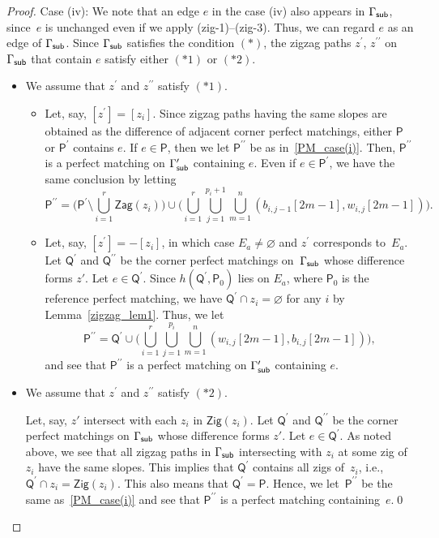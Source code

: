 \documentclass[pdftex]{sigma}%
\numberwithin{equation}{section}
\numberwithin{figure}{section}
\numberwithin{table}{section}
\newcommand{\sfP}{\mathsf{P}}
\newcommand{\sfQ}{\mathsf{Q}}
\newcommand{\Zig}{\mathsf{Zig}}
\newcommand{\Zag}{\mathsf{Zag}}
\begin{document}
\begin{proof}
Case (iv): We note that an edge $e$ in the case (iv) also appears in $\Gamma_{\sf sub}$, since~$e$ is unchanged even if we apply (zig-1)--(zig-3).
Thus, we can regard $e$ as an edge of $\Gamma_{\sf sub}$.
Since $\Gamma_{\sf sub}$ satisfies the condition $(*)$, the zigzag paths $z^\prime$, $z^{\prime\prime}$ on~$\Gamma_{\sf sub}$ that contain $e$ satisfy
either $(*1)$ or $(*2)$.
\begin{itemize}\itemsep=0pt
\item We assume that $z^\prime$ and $z^{\prime\prime}$ satisfy $(*1)$.
\begin{itemize}\itemsep=0pt
\item Let, say, $[z^\prime]=[z_i]$.
Since zigzag paths having the same slopes are obtained as the difference of adjacent corner perfect matchings, either $\sfP$ or $\sfP^\prime$ contains $e$.
If $e \in \sfP$, then we let $\sfP^{\prime\prime}$ be as in~\eqref{PM_case(i)}.
Then, $\sfP^{\prime\prime}$ is a perfect matching on $\Gamma^\prime_{\sf sub}$ containing $e$.
Even if $e \in \sfP^\prime$, we have the same conclusion by letting
\begin{displaymath}
\sfP^{\prime\prime}=\bigg(\sfP^\prime \setminus \bigcup_{i=1}^r \Zag(z_i)\bigg) \cup \bigg(\bigcup_{i=1}^r \bigcup_{j=1}^{p_i+1} \bigcup_{m=1}^n(b_{i,j-1}[2m-1],w_{i,j}[2m-1])\bigg).
\end{displaymath}
\item Let, say, $[z^\prime]=-[z_i]$, in which case $E_a\neq \varnothing$ and $z^\prime$ corresponds to~$E_a$.
Let $\sfQ^\prime$ and $\sfQ^{\prime\prime}$ be the corner perfect matchings on~$\Gamma_{\sf sub}$ whose difference forms $z'$. Let $e \in \sfQ^\prime$.
Since $h(\sfQ^\prime,\sfP_0)$ lies on $E_a$, where $\sfP_0$ is the reference perfect matching, we have $\sfQ^\prime\cap z_i=\varnothing$ for any $i$ by Lemma~\ref{zigzag_lem1}.
Thus, we let
\begin{displaymath}
\sfP^{\prime\prime}=\sfQ^\prime \cup \bigg(\bigcup_{i=1}^r \bigcup_{j=1}^{p_i} \bigcup_{m=1}^n(w_{i,j}[2m-1],b_{i,j}[2m-1])\bigg),
\end{displaymath}
and see that $\sfP^{\prime\prime}$ is a perfect matching on $\Gamma^\prime_{\sf sub}$ containing $e$.
\end{itemize}
\item We assume that $z^\prime$ and $z^{\prime\prime}$ satisfy $(*2)$.

Let, say, $z'$ intersect with each $z_i$ in $\Zig(z_i)$. Let $\sfQ^\prime$ and $\sfQ^{\prime\prime}$ be the corner perfect matchings on $\Gamma_{\sf sub}$ whose difference forms $z'$. Let $e \in \sfQ^\prime$.
As noted above, we see that all zigzag paths in $\Gamma_{\sf sub}$ intersecting with $z_i$ at some zig of $z_i$ have the same slopes.
This implies that $\sfQ^\prime$ contains all zigs of~$z_i$, i.e., $\sfQ^\prime \cap z_i=\Zig(z_i)$. This also means that $\sfQ^\prime=\sfP$.
Hence, we let~$\sfP^{\prime\prime}$ be the same as~\eqref{PM_case(i)} and see that $\sfP^{\prime\prime}$ is a perfect matching containing~$e$.\hfill\qed
\end{itemize}
\renewcommand{\qed}{}
\end{proof}
\end{document}
